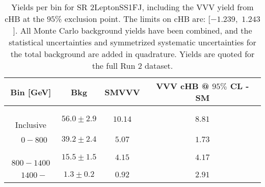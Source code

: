 \begin{table}[!htbp]
    \small
    \center
    \begin{tabular}{c||c|c|c}
    Bin [GeV] & Bkg & SMVVV & \pbox{20cm}{VVV \\ cHB @ $95\%$ CL - SM \\ }\\
    \hline
    \pbox{20cm}{ ~ \\Inclusive\\ } & $56.0 \pm 2.9$ & $10.14$ & $8.81$\\
    \hline
    \pbox{20cm}{ ~ \\$0-800$\\ } & $39.2 \pm 2.4$ & $5.07$ & $1.73$\\
    \hline
    \pbox{20cm}{ ~ \\$800-1400$\\ } & $15.5 \pm 1.5$ & $4.15$ & $4.17$\\
    \hline
    \pbox{20cm}{ ~ \\$1400-$\\ } & $1.3 \pm 0.2$ & $0.92$ & $2.91$\\
\end{tabular}
    \caption{Yields per bin for SR 2LeptonSS1FJ, including the VVV yield from cHB at the $95$\% exclusion point. The limits on cHB are: [$-1.239$,~$1.243$]. All Monte Carlo background yields have been combined, and the statistical uncertainties and symmetrized systematic uncertainties for the total background are added in quadrature. Yields are quoted for the full Run 2 dataset.}
    \label{tab:2LeptonSS1FJ$binssignal}
\end{table}
